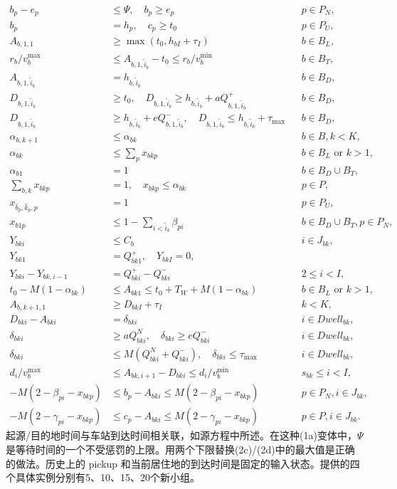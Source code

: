 \documentclass{article}
\begin{document}
\begin{align*}
b_p-e_p&\le\Psi,\quad b_p\ge e_p&&p\in P_N,\\
b_p&=h_p,\quad c_p\ge t_0&&p\in P_U,\\
A_{b,1,1}&\ge\max(t_0,h_{bI}+\tau_I)&&b\in B_L,\\
r_b/v_b^{\max}&\le A_{b,1,\tilde i_b}-t_0\le r_b/v_b^{\min}&&b\in B_T,\\
A_{b,1,\tilde i_b}&=h_{b,\tilde i_b}&&b\in B_D,\\
D_{b,1,\tilde i_b}&\ge t_0,\quad
D_{b,1,\tilde i_b}\ge h_{b,\tilde i_b}+aQ^+_{b,1,\tilde i_b}&&b\in B_D,\\
D_{b,1,\tilde i_b}&\ge h_{b,\tilde i_b}+eQ^-_{b,1,\tilde i_b},\quad
D_{b,1,\tilde i_b}\le h_{b,\tilde i_b}+\tau_{\max}&&b\in B_D,\\
\alpha_{b,k+1}&\le\alpha_{bk}&&b\in B,k<K,\\
\alpha_{bk}&\le\sum_p x_{bkp}&&b\in B_L\text{ or }k>1,\\
\alpha_{b1}&=1&&b\in B_D\cup B_T,\\
\sum_{b,k}x_{bkp}&=1,\quad x_{bkp}\le\alpha_{bk}&&p\in P,\\
x_{\hat b_p,\hat k_p,p}&=1&&p\in P_U,\\
x_{b1p}&\le1-\sum_{i<\tilde i_b}\beta_{pi}&&b\in B_D\cup B_T,p\in P_N,\\
Y_{bki}&\le C_b&&i\in J_{bk},\\
Y_{bk1}&=Q^+_{bk1},\quad Y_{bkI}=0,\\
Y_{bki}-Y_{bk,i-1}&=Q^+_{bki}-Q^-_{bki}&&2\le i<I,\\
t_0-M(1-\alpha_{bk})&\le A_{bk1}\le t_0+T_W+M(1-\alpha_{bk})
&&b\in B_L\text{ or }k>1,\\
A_{b,k+1,1}&\ge D_{bkI}+\tau_I&&k<K,\\
D_{bki}-A_{bki}&=\delta_{bki}&&i\in Dwell_{bk},\\
\delta_{bki}&\ge aQ^N_{bki},\quad\delta_{bki}\ge eQ^-_{bki}
&&i\in Dwell_{bk},\\
\delta_{bki}&\le M(Q^N_{bki}+Q^-_{bki}),\quad
\delta_{bki}\le\tau_{\max}&&i\in Dwell_{bk},\\
d_i/v_b^{\max}&\le A_{bk,i+1}-D_{bki}\le d_i/v_b^{\min}
&&s_{bk}\le i<I,\\
-M(2-\beta_{pi}-x_{bkp})&\le b_p-A_{bki}\le M(2-\beta_{pi}-x_{bkp})
&&p\in P_N,i\in J_{bk},\\
-M(2-\gamma_{pi}-x_{bkp})&\le c_p-A_{bki}\le M(2-\gamma_{pi}-x_{bkp})
&&p\in P,i\in J_{bk}.
\end{align*}
起源/目的地时间与车站到达时间相关联，如源方程中所述。在这种(1a)变体中，$\Psi$是等待时间的一个不受惩罚的上限。用两个下限替换(2c)/(2d)中的最大值是正确的做法。历史上的 pickup 和当前居住地的到达时间是固定的输入状态。提供的四个具体实例分别有5、10、15、20个新小组。
\end{document}
